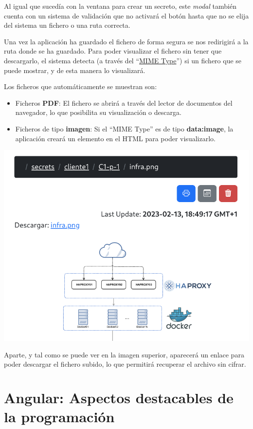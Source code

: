 \documentclass{\ClassPath/viu-tfm-template}
\begin{document}
Al igual que sucedía con la ventana para crear un secreto, este \textit{modal} también cuenta con un sistema de validación que no activará el botón hasta que no se elija del sistema un fichero o una ruta correcta.

Una vez la aplicación ha guardado el fichero de forma segura se nos redirigirá a la ruta donde se ha guardado. Para poder visualizar el fichero sin tener que descargarlo, el sistema detecta (a través del “\href{https://en.wikipedia.org/wiki/Media_type}{MIME Type}”) si un fichero que se puede mostrar, y de esta manera lo visualizará.

Los ficheros que automáticamente se muestran son:

\begin{itemize}
    \item Ficheros \textbf{PDF}: El fichero se abrirá a través del lector de documentos del navegador, lo que posibilita su visualización o descarga.
    \item Ficheros de tipo \textbf{imagen}: Si el “MIME Type” es de tipo \textbf{data:image}, la aplicación creará un elemento en el HTML para poder visualizarlo.
\end{itemize}

\begin{center}
    \includegraphics[frame,width=0.7\linewidth]{img/upload_download.png}
\end{center}

Aparte, y tal como se puede ver en la imagen superior, aparecerá un enlace para poder descargar el fichero subido, lo que permitirá recuperar el archivo sin cifrar.

\section{Angular: Aspectos destacables de la programación}
\end{document}
